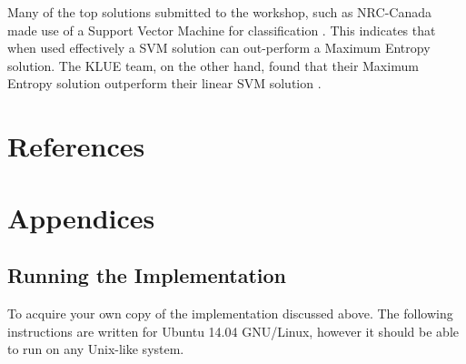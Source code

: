 \documentclass[final,3p,12pt]{elsarticle}
\begin{document}
Many of the top solutions submitted to the workshop, such as NRC-Canada made
use of a Support Vector Machine for classification \cite{Mohammad2013}.  This
indicates that when used effectively a SVM solution can out-perform a Maximum
Entropy solution. The KLUE team, on the other hand, found that their Maximum
Entropy solution outperform their linear SVM solution \cite{Proisl2013}.

\section{References}
\label{section:referances}

\nocite{*}



\section{Appendices}
\label{section:appendices}

\subsection{Running the Implementation}
\label{ssection:runningtheimplementation}

To acquire your own copy of the implementation discussed above. The following
instructions are written for Ubuntu 14.04 GNU/Linux, however it should be able
to run on any Unix-like system.
\end{document}
